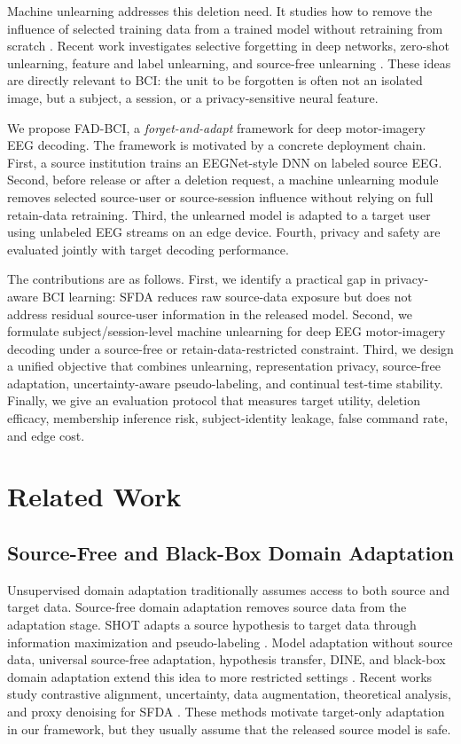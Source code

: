 \documentclass[10pt,twocolumn]{article}
\begin{document}
Machine unlearning addresses this deletion need. It studies how to remove the influence of selected training data from a trained model without retraining from scratch \cite{ginart2019making,guo2020certified,bourtoule2021machine,graves2021amnesiac}. Recent work investigates selective forgetting in deep networks, zero-shot unlearning, feature and label unlearning, and source-free unlearning \cite{golatkar2020eternal,chen2023zeroshot,warnecke2023features,ahmed2025sourcefree}. These ideas are directly relevant to BCI: the unit to be forgotten is often not an isolated image, but a subject, a session, or a privacy-sensitive neural feature.

We propose FAD-BCI, a \emph{forget-and-adapt} framework for deep motor-imagery EEG decoding. The framework is motivated by a concrete deployment chain. First, a source institution trains an EEGNet-style DNN on labeled source EEG. Second, before release or after a deletion request, a machine unlearning module removes selected source-user or source-session influence without relying on full retain-data retraining. Third, the unlearned model is adapted to a target user using unlabeled EEG streams on an edge device. Fourth, privacy and safety are evaluated jointly with target decoding performance.

The contributions are as follows. First, we identify a practical gap in privacy-aware BCI learning: SFDA reduces raw source-data exposure but does not address residual source-user information in the released model. Second, we formulate subject/session-level machine unlearning for deep EEG motor-imagery decoding under a source-free or retain-data-restricted constraint. Third, we design a unified objective that combines unlearning, representation privacy, source-free adaptation, uncertainty-aware pseudo-labeling, and continual test-time stability. Finally, we give an evaluation protocol that measures target utility, deletion efficacy, membership inference risk, subject-identity leakage, false command rate, and edge cost.

\section{Related Work}
\subsection{Source-Free and Black-Box Domain Adaptation}
Unsupervised domain adaptation traditionally assumes access to both source and target data. Source-free domain adaptation removes source data from the adaptation stage. SHOT adapts a source hypothesis to target data through information maximization and pseudo-labeling \cite{liang2020shot}. Model adaptation without source data, universal source-free adaptation, hypothesis transfer, DINE, and black-box domain adaptation extend this idea to more restricted settings \cite{kundu2020universal,liang2022dine}. Recent works study contrastive alignment, uncertainty, data augmentation, theoretical analysis, and proxy denoising for SFDA \cite{hwang2024sfda2,tang2025prode,mitsuzumi2024theory}. These methods motivate target-only adaptation in our framework, but they usually assume that the released source model is safe.
\end{document}
